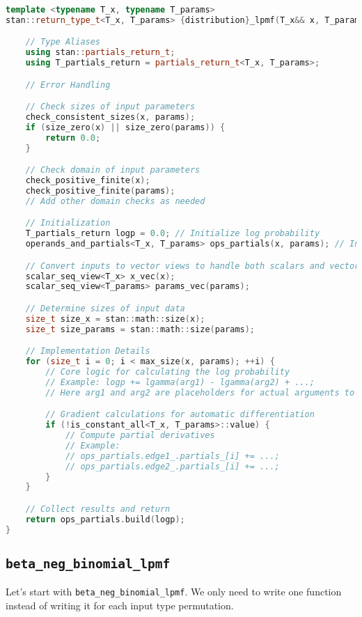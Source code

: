 \documentclass[11pt]{article}
\begin{document}
\begin{lstlisting}[language=c++, style=lgeneral]
template <typename T_x, typename T_params>
stan::return_type_t<T_x, T_params> {distribution}_lpmf(T_x&& x, T_params&& params) {

    // Type Aliases
    using stan::partials_return_t;
    using T_partials_return = partials_return_t<T_x, T_params>;

    // Error Handling

    // Check sizes of input parameters
    check_consistent_sizes(x, params);
    if (size_zero(x) || size_zero(params)) {
        return 0.0;
    }

    // Check domain of input parameters
    check_positive_finite(x);
    check_positive_finite(params);
    // Add other domain checks as needed

    // Initialization
    T_partials_return logp = 0.0; // Initialize log probability
    operands_and_partials<T_x, T_params> ops_partials(x, params); // Initialize partial derivatives

    // Convert inputs to vector views to handle both scalars and vectors
    scalar_seq_view<T_x> x_vec(x);
    scalar_seq_view<T_params> params_vec(params);

    // Determine sizes of input data
    size_t size_x = stan::math::size(x);
    size_t size_params = stan::math::size(params);

    // Implementation Details
    for (size_t i = 0; i < max_size(x, params); ++i) {
        // Core logic for calculating the log probability
        // Example: logp += lgamma(arg1) - lgamma(arg2) + ...;
        // Here arg1 and arg2 are placeholders for actual arguments to the lgamma function

        // Gradient calculations for automatic differentiation
        if (!is_constant_all<T_x, T_params>::value) {
            // Compute partial derivatives
            // Example:
            // ops_partials.edge1_.partials_[i] += ...;
            // ops_partials.edge2_.partials_[i] += ...;
        }
    }

    // Collect results and return
    return ops_partials.build(logp);
}


\end{lstlisting}





\cprotect\subsection{\verb|beta_neg_binomial_lpmf|}
Let's start with \verb|beta_neg_binomial_lpmf|. We only need to write one function instead of writing it for each input type permutation.
\end{document}
